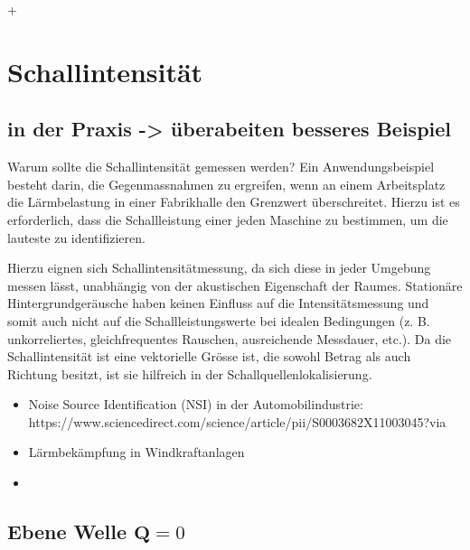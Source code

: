 
+%
%
%
%
\section{Schallintensität
\label{helmholtz:section:teil1}}


\subsection{in der Praxis -> überabeiten besseres Beispiel}

Warum sollte die Schallintensität gemessen werden? Ein Anwendungsbeispiel besteht darin, die Gegenmassnahmen zu ergreifen, wenn an einem Arbeitsplatz die Lärmbelastung in einer Fabrikhalle den Grenzwert überschreitet. Hierzu ist es erforderlich, dass die Schallleistung einer jeden Maschine zu bestimmen, um die lauteste zu identifizieren.  \newline

Hierzu eignen sich Schallintensitätmessung, da sich diese in jeder Umgebung messen lässt, unabhängig von der akustischen Eigenschaft der Raumes. Stationäre Hintergrundgeräusche haben keinen Einfluss auf die Intensitätsmessung und somit auch nicht auf die Schallleistungswerte bei idealen Bedingungen (z. B. unkorreliertes, gleichfrequentes Rauschen, ausreichende Messdauer, etc.). Da die Schallintensität ist eine vektorielle Grösse ist, die sowohl Betrag als auch Richtung besitzt, ist sie hilfreich in der Schallquellenlokalisierung.

\begin{itemize}
\item Noise Source Identification (NSI) in der Automobilindustrie: https://www.sciencedirect.com/science/article/pii/S0003682X11003045?via%
\item Lärmbekämpfung in Windkraftanlagen
\item 
\end{itemize}



\subsection{Ebene Welle $\mathbf{Q} = 0$
\label{helmholtz:subsection:ebeneWelle}}

